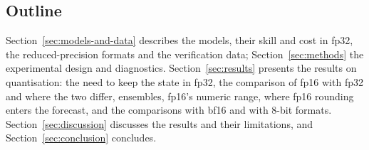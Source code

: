 \subsection{Outline}
\label{sec:intro-outline}

Section~\ref{sec:models-and-data} describes the models, their
skill and cost in fp32, the reduced-precision formats and the
verification data; Section~\ref{sec:methods} the experimental design and
diagnostics. Section~\ref{sec:results} presents the results on
quantisation: the need to keep the state in fp32, the comparison of fp16
with fp32 and where the two differ, ensembles, fp16's numeric range, where fp16
rounding enters the forecast, and the comparisons with bf16 and with
8-bit formats. Section~\ref{sec:discussion}
discusses the results and their limitations, and
Section~\ref{sec:conclusion} concludes.
